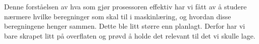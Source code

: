 Denne forståelsen av hva som gjør prosessoren effektiv har vi fått av å studere nærmere hvilke beregninger som skal til i maskinlæring, og hvordan disse beregningene henger sammen. Dette ble litt større enn planlagt. Derfor har vi bare skrapet litt på overflaten og prøvd å holde det relevant til det vi skulle lage.


\newpage
\printbibliography[title=Referanser]
